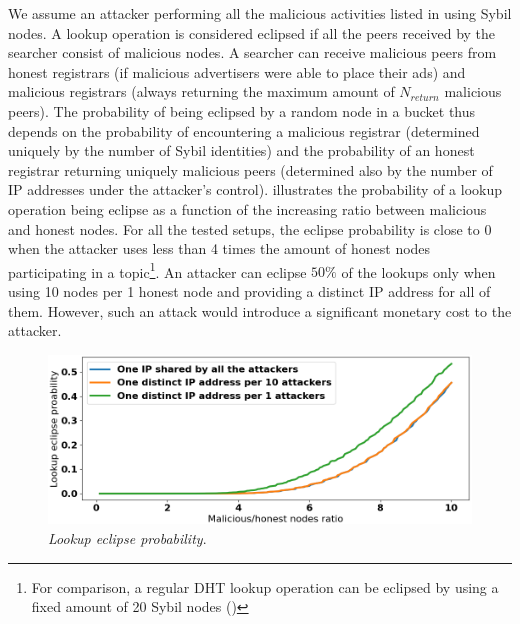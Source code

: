We assume an attacker performing all the malicious activities listed in  using Sybil nodes. A lookup operation is considered eclipsed if all the peers received by the searcher consist of malicious nodes. A searcher can receive malicious peers from honest registrars (if malicious advertisers were able to place their ads) and malicious registrars (always returning the maximum amount of $N_\textit{return}$ malicious peers). The probability of being eclipsed by a random node in a bucket thus depends on the probability of encountering a malicious registrar (determined uniquely by the number of Sybil identities) and the probability of an honest registrar returning uniquely malicious peers (determined also by the number of IP addresses under the attacker's control).  illustrates the probability of a lookup operation being eclipse as a function of the increasing ratio between malicious and honest nodes. For all the tested setups, the eclipse probability is close to $0$ when the attacker uses less than 4 times the amount of honest nodes participating in a topic\footnote{For comparison, a regular DHT lookup operation can be eclipsed by using a fixed amount of 20 Sybil nodes ()}. An attacker can eclipse $50\%$  of the lookups only when using 10 nodes per 1 honest node and providing a distinct IP address for all of them. However, such an attack would introduce a significant monetary cost to the attacker. 

\begin{figure}[t]
    \includegraphics[width=1\linewidth]{img/eclipse_probability}
    \vspace{-0.05in}
    \caption{\emph{Lookup eclipse probability}.
    }
    \label{fig:eclipse_probability}
    \vspace{-0.20in}
\end{figure}

